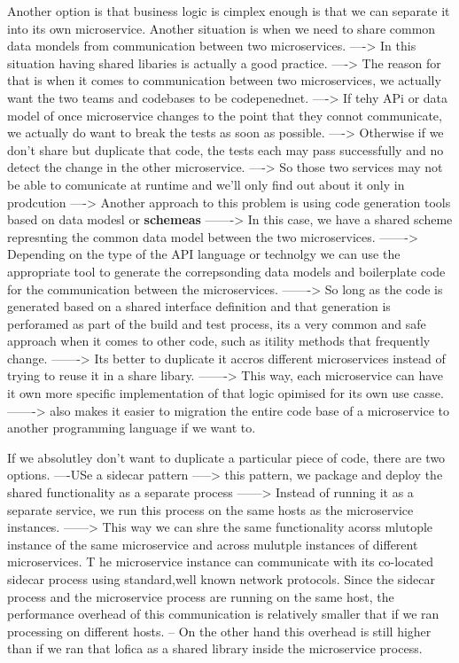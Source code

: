 \documentclass[a4paper, 11pt]{book}
\begin{document}
    Another option is that business logic is cimplex enough is that we can separate it into its own microservice.
    Another situation is when we need to share common data mondels from communication between two microservices.
    ----> In this situation having shared libaries is actually a good practice.
    ----> The reason for that is when it comes to communication between two microservices, we actually want the two teams and codebases to be codepenednet.
    ----> If tehy APi or data model of once microservice changes to the point that they connot communicate, we actually do want to break the tests as soon as possible.
    ----> Otherwise if we don't share but duplicate that code, the tests each may pass successfully and no detect the change in the other microservice.
    ----> So those two services may not be able to comunicate at runtime and we'll only find out about it only in prodcution
    ----> Another approach to this problem is using code generation tools based on data modesl or \textbf{schemeas}
    -------> In this case, we have a shared scheme represnting the common data model between the two microservices.
    -------> Depending on the type of the API language or technolgy we can use the appropriate tool to generate the correpsonding data models and boilerplate code for the communication between the microservices.
    -------> So long as the code is generated based on a shared interface definition and that generation is perforamed as part of the build and test process, its a very common and safe approach when it comes to other code, such as itility methods that frequently change.
    -------> Its better to duplicate it accros different microservices instead of trying to reuse it in a share libary.
    -------> This way, each microservice can have it own more specific implementation of that logic opimised for its own use casse.
    -------> also makes it easier to migration the entire code base of a microservice to another programming language if we want to.

    If we absolutley don't want to duplicate a particular piece of code, there are two options.
    ----USe a sidecar pattern
    -----> this pattern, we package and deploy the shared functionality as a separate process
    ------> Instead of running it as a separate service, we run this process on the same hosts as the microservice instances.
    ------> This way we can shre the same functionality acorss mlutople instance of the same microservice and across mulutple instances of different microservices.
    T he microservice instance can communicate with its co-located sidecar process using standard,well known network protocols.
    Since the sidecar process and the microservice process are running on the same host, the performance overhead of this communication is relatively smaller that if we ran processing on different hosts.
    -- On the other hand this overhead is still higher than if we ran that lofica as a shared library inside the microservice process.
\end{document}
